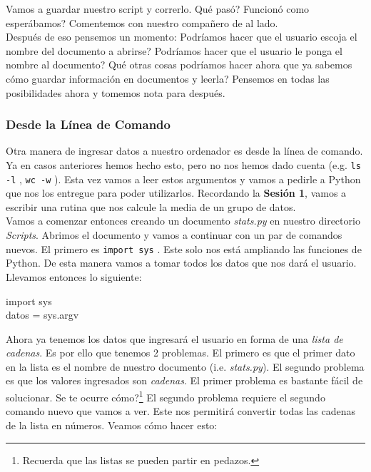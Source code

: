 \documentclass[10pt,letterpaper]{article}
\newcommand{\inlinecode}[1]{
\colorbox{light-gray}{\texttt{#1}}
}
\newenvironment{Code}
{
\begin{lrbox}{\selvestebox}%
\begin{minipage}{\dimexpr\columnwidth-2\fboxsep\relax}
\fontfamily{\ttdefault}\selectfont
}
{\end{minipage}\end{lrbox}%
\begin{center}
\colorbox{light-gray}{\usebox{\selvestebox}}
\end{center}
}
\begin{document}
Vamos a guardar nuestro script y correrlo. Qu\'e pas\'o? Funcion\'o como esper\'abamos? Comentemos con nuestro compa\~nero de al lado.\\

Despu\'es de eso pensemos un momento: Podr\'iamos hacer que el usuario escoja el nombre del documento a abrirse? Podr\'iamos hacer que el usuario le ponga el nombre al documento? Qu\'e otras cosas podr\'iamos hacer ahora que ya sabemos c\'omo guardar informaci\'on en documentos y leerla? Pensemos en todas las posibilidades ahora y tomemos nota para despu\'es.

\subsubsection{Desde la L\'inea de Comando}
Otra manera de ingresar datos a nuestro ordenador es desde la l\'inea de comando. Ya en casos anteriores hemos hecho esto, pero no nos hemos dado cuenta (e.g. \inlinecode{ls -l}, \inlinecode{wc -w}). Esta vez vamos a leer estos argumentos y vamos a pedirle a Python que nos los entregue para poder utilizarlos. Recordando la \textbf{Sesi\'on 1}, vamos a escribir una rutina que nos calcule la media de un grupo de datos.\\

Vamos a comenzar entonces creando un documento \textit{stats.py} en nuestro directorio \textit{Scripts}. Abrimos el documento y vamos a continuar con un par de comandos nuevos. El primero es \inlinecode{import sys}. Este solo nos est\'a ampliando las funciones de Python. De esta manera vamos a tomar todos los datos que nos dar\'a el usuario. Llevamos entonces lo siguiente:

\begin{Code}
import sys\\
datos = sys.argv
\end{Code}

Ahora ya tenemos los datos que ingresar\'a el usuario en forma de una \emph{lista de cadenas}. Es por ello que tenemos 2 problemas. El primero es que el primer dato en la lista es el nombre de nuestro documento (i.e. \emph{stats.py}). El segundo problema es que los valores ingresados son \emph{cadenas}. El primer problema es bastante f\'acil de solucionar. Se te ocurre c\'omo?\footnote{Recuerda que las listas se pueden partir en pedazos.} El segundo problema requiere el segundo comando nuevo que vamos a ver. Este nos permitir\'a convertir todas las cadenas de la lista en n\'umeros. Veamos c\'omo hacer esto:
\end{document}
